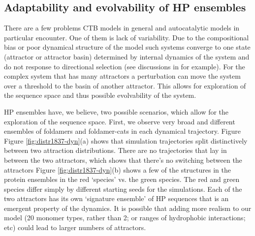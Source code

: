\documentclass[5p,times]{elsarticle}
\begin{document}
\subsection{Adaptability and evolvability of HP ensembles}
There are a few problems CTB models in general and autocatalytic models in particular encounter. 
One of them is lack of variability. Due to the compositional bias or poor dynamical structure of 
the model such systems converge to one state (attractor or attractor basin) determined by 
internal dynamics of the system and do not response to directional 
selection (see discussions in \cite{Derr2012,Vasas2015} for example). For the complex system that 
has many attractors a  perturbation can move the system over a threshold to the basin of another 
attractor. This allows for exploration of the sequence space and thus possible evolvability of the 
system. 

HP ensembles have, we believe, two possible scenarios, which allow for the exploration of the 
sequence space.  First, we observe very broad and different ensembles of foldamers and 
foldamer-cats in each dynamical trajectory.  Figure  Figure 
\ref{fig:distr1837-dyn}(a) shows that simulation trajectories split distinctively between two 
attraction distributions. There are no trajectories that lay in between the two attractors, which 
shows that there's no switching between the attractors  Figure 
\ref{fig:distr1837-dyn}(b) shows a few of the structures in the protein ensembles in the red 
`species' vs. the green species.  The red and green species differ simply by different starting 
seeds for the simulations.  Each of the two attractors has its own `signature ensemble' of HP 
sequences that is an emergent property of the dynamics.  It is possible that adding more realism to 
our model (20 monomer types, rather than 2; or ranges of hydrophobic interactions; etc) could lead 
to larger numbers of attractors.
 
\end{document}
